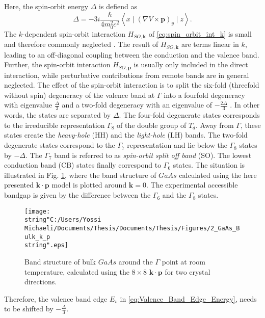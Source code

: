 Here, the spin-orbit energy $\Delta$ is defiend as \begin{equation}
\Delta=-3i\frac{\hbar}{4m_{0}^{2}c^{2}}\left\langle x\mid\left(\nabla V\times\mathbf{p}\right)_{y}\mid z\right\rangle .\end{equation}
The $k$-dependent spin-orbit interaction $H_{SO,\mathbf{k}}$ of
\ref{eq:spin_orbit_int_k} is small and therefore commonly neglected
\citet{kane_handbooksemiconductors_1982}. The result of $H_{SO,\mathbf{k}}$
are terms linear in $k$, leading to an off-diagonal coupling between
the conduction and the valence band. Further, the spin-orbit interaction
$H_{SO,\mathbf{p}}$ is usually only included in the direct interaction,
while perturbative contributions from remote bands are in general
neglected. The effect of the spin-orbit interaction is to split the
six-fold (threefold without spin) degeneracy of the valence band at
$\Gamma$ into a fourfold degeneracy with eigenvalue $\frac{\Delta}{3}$
and a two-fold degeneracy with an eigenvalue of $-\frac{2\Delta}{3}$
. In other words, the states are separated by $\Delta$. The four-fold
degenerate states corresponds to the irreducible representation $\Gamma_{8}$
of the double group of $T_{d}$. Away from $\Gamma$, these states
create the \emph{heavy-hole} (HH) and the\emph{ light-hole} (LH) bands.
The two-fold degenerate states correspond to the $\Gamma_{7}$ representation
and lie below the $\Gamma_{8}$ states by $-\Delta$. The $\Gamma_{7}$
band is referred to as \emph{spin-orbit split off band} (SO). The
lowest conduction band (CB) states finally correspond to $\Gamma_{6}$
states. The situation is illustrated in Fig. \ref{fig:GaAs_Bulk_Bands},
where the band structure of $GaAs$ calculated using the here presented
$\mathbf{k}\cdot\mathbf{p}$ model is plotted around $\mathbf{k}=0$.
The experimental accessible bandgap is given by the difference between
the $\Gamma_{6}$ and the $\Gamma_{8}$ states.%
\begin{figure}
\begin{centering}
\texttt{[image: \\string"C:/Users/Yossi Michaeli/Documents/Thesis/Documents/Thesis/Figures/2\_GaAs\_Bulk\_k\_p\\string".eps]}
\par\end{centering}

\caption{\label{fig:GaAs_Bulk_Bands}Band structure of bulk $GaAs$ around
the $\Gamma$ point at room temperature, calculated using the $8\times8$
$\mathbf{k}\cdot\mathbf{p}$ for two crystal directions.}



\end{figure}
Therefore, the valence band edge $E_{v}$ in \ref{eq:Valence_Band_Edge_Energy},
needs to be shifted by $-\frac{\Delta}{3}$. 

